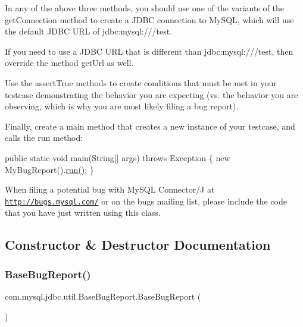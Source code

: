 In any of the above three methods, you should use one of the variants of the \textquotesingle{}get\+Connection\textquotesingle{} method to create a J\+D\+BC connection to My\+S\+QL, which will use the default J\+D\+BC U\+RL of \textquotesingle{}jdbc\+:mysql\+:///test\textquotesingle{}.

If you need to use a J\+D\+BC U\+RL that is different than \textquotesingle{}jdbc\+:mysql\+:///test\textquotesingle{}, then override the method \textquotesingle{}get\+Url\textquotesingle{} as well.

Use the \textquotesingle{}assert\+True\textquotesingle{} methods to create conditions that must be met in your testcase demonstrating the behavior you are expecting (vs. the behavior you are observing, which is why you are most likely filing a bug report).

Finally, create a \textquotesingle{}main\textquotesingle{} method that creates a new instance of your testcase, and calls the \textquotesingle{}run\textquotesingle{} method\+:


\begin{DoxyPre}
public static void main(String[] args) throws Exception \{
    new MyBugReport().\mbox{\hyperlink{classcom_1_1mysql_1_1jdbc_1_1util_1_1_base_bug_report_ab8d6a080a34fed2a99c651d1d5870eb1}{run()}};
\}
\end{DoxyPre}


When filing a potential bug with My\+S\+QL Connector/J at \href{http://bugs.mysql.com/}{\tt http\+://bugs.\+mysql.\+com/} or on the bugs mailing list, please include the code that you have just written using this class. 

\subsection{Constructor \& Destructor Documentation}
\mbox{\label{classcom_1_1mysql_1_1jdbc_1_1util_1_1_base_bug_report_a886696416ed381d447df7e5ae81f974b}} 
\subsubsection{\texorpdfstring{Base\+Bug\+Report()}{BaseBugReport()}}
{\footnotesize\ttfamily com.\+mysql.\+jdbc.\+util.\+Base\+Bug\+Report.\+Base\+Bug\+Report (\begin{DoxyParamCaption}{ }\end{DoxyParamCaption})}


